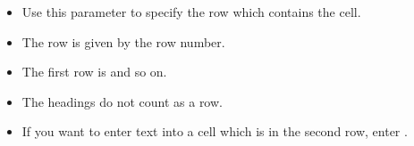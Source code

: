 \begin{itemize}
\item Use this parameter to specify the row which contains the cell.
\item The row is given by the row number.
\item The first row is  and so on.
\item The headings do not count as a row. 
\item If you want to enter text into a cell which is in the second row, enter .
\end{itemize}
    